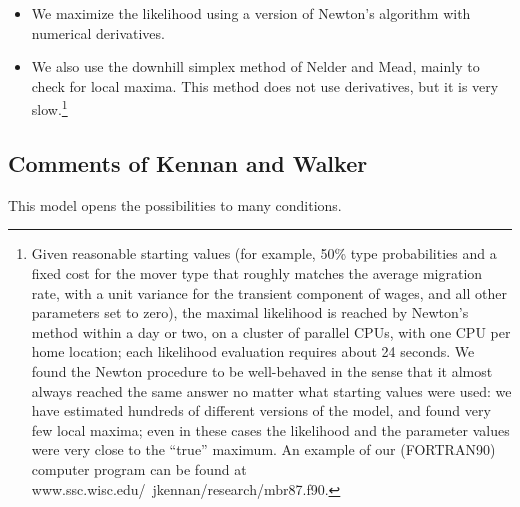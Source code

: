 \documentclass{article}
\numberwithin{equation}{section} %
\begin{document}
\begin{itemize}
  \item We maximize the likelihood using a version of Newton’s algorithm with numerical derivatives. 
  \item We also use the downhill simplex method of Nelder and Mead, mainly to  check for local maxima. This method does not use derivatives, but it is very slow.\footnote{Given reasonable starting values (for example, 50\% type probabilities and a fixed cost for the mover type that roughly matches the average migration rate, with a unit variance for the transient component of wages, and all other parameters set to zero), the maximal likelihood is reached by Newton’s method within a day or two, on a cluster of parallel CPUs, with one CPU per home location; each likelihood evaluation requires about 24 seconds. We found the Newton procedure to be well-behaved in the sense that it almost always reached the same answer no matter what starting values were used: we have estimated hundreds of different versions of the model, and found very few local maxima; even in these cases the likelihood and the parameter values were very close to the “true” maximum. An example of our (FORTRAN90) computer program can be found at www.ssc.wisc.edu/~jkennan/research/mbr87.f90.}
\end{itemize}


































\subsection{Comments of Kennan and Walker} %
\label{sub:comments_of_kennan_and_walker}
This model opens the possibilities to many conditions.
\end{document}
